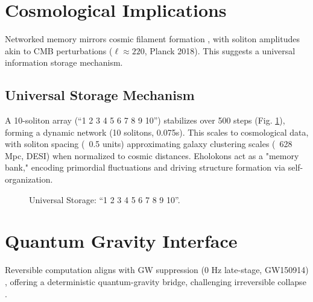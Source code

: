 \documentclass[11pt]{article}
\begin{document}
\section{Cosmological Implications}
Networked memory mirrors cosmic filament formation \citep{emvula2025cosmology}, with soliton amplitudes akin to CMB perturbations (\(\ell \approx 220\), Planck 2018). This suggests a universal information storage mechanism.

\subsection{Universal Storage Mechanism}
A 10-soliton array (``1 2 3 4 5 6 7 8 9 10'') stabilizes over 500 steps (Fig. \ref{fig:universal}), forming a dynamic network (10 solitons, 0.075s). This scales to cosmological data, with soliton spacing (~0.5 units) approximating galaxy clustering scales (~628 Mpc, DESI) when normalized to cosmic distances. Eholokons act as a "memory bank," encoding primordial fluctuations and driving structure formation via self-organization.
\begin{figure}[h]
    \centering
    \caption{Universal Storage: ``1 2 3 4 5 6 7 8 9 10''.}
    \label{fig:universal}
\end{figure}

\section{Quantum Gravity Interface}
Reversible computation aligns with GW suppression (0 Hz late-stage, GW150914) \citep{emvula2025quantumgravity}, offering a deterministic quantum-gravity bridge, challenging irreversible collapse \citep{emvula2025measurement}.
\end{document}
